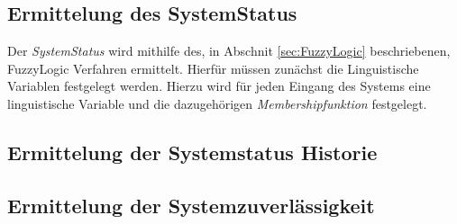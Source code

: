 \subsection{Ermittelung des SystemStatus}
Der \textit{SystemStatus} wird mithilfe des, in Abschnit \ref{sec:FuzzyLogic} beschriebenen, FuzzyLogic Verfahren ermittelt. Hierfür müssen zunächst die Linguistische Variablen festgelegt werden. Hierzu wird für jeden Eingang des Systems eine linguistische Variable und die dazugehörigen \textit{Membershipfunktion} festgelegt.  


\subsection{Ermittelung der Systemstatus Historie}
\subsection{Ermittelung der Systemzuverlässigkeit}